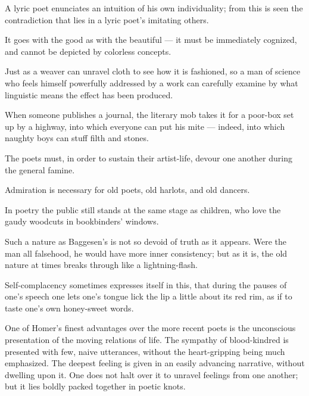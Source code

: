 \documentclass[12pt,a4paper]{article}
\newcommand{\opage}[1]{\marginnote{\footnotesize\textit{[#1]}}}
\newcommand{\aphsep}{\par\smallskip\centerline{\textasteriskcentered}\smallskip}
\begin{document}
\aphsep

A lyric poet enunciates an intuition of his own individuality; from this is seen
the contradiction that lies in a lyric poet's imitating others.

\aphsep

It goes with the good as with the beautiful --- it must be immediately cognized,
and cannot be depicted by colorless concepts.

\aphsep

Just as a weaver can unravel cloth to see how it is fashioned, so a man of science
who feels himself powerfully addressed by a work can carefully examine by what
linguistic means the effect has been produced.

\aphsep

When someone publishes a journal, the literary mob takes it for a poor-box set up
by a highway, into which everyone can put his mite --- indeed, into which naughty
boys can stuff filth and stones.

\aphsep

The poets must, in order to sustain their artist-life, devour one another during
the general famine.

\aphsep

Admiration is necessary for old poets, old harlots, and old dancers.

\aphsep

In poetry the public still stands at the same stage as children, who love the
gaudy woodcuts in bookbinders' windows.

\aphsep

\opage{40}Such a nature as Baggesen's is not so devoid of truth as it appears.
Were the man all falsehood, he would have more inner consistency; but as it is,
the old nature at times breaks through like a lightning-flash.

\aphsep

Self-complacency sometimes expresses itself in this, that during the pauses of
one's speech one lets one's tongue lick the lip a little about its red rim, as if
to taste one's own honey-sweet words.

\aphsep

One of Homer's finest advantages over the more recent poets is the unconscious
presentation of the moving relations of life. The sympathy of blood-kindred is
presented with few, naive utterances, without the heart-gripping being much
emphasized. The deepest feeling is given in an easily advancing narrative,
without dwelling upon it. One does not halt over it to unravel feelings from one
another; but it lies boldly packed together in poetic knots.
\end{document}

